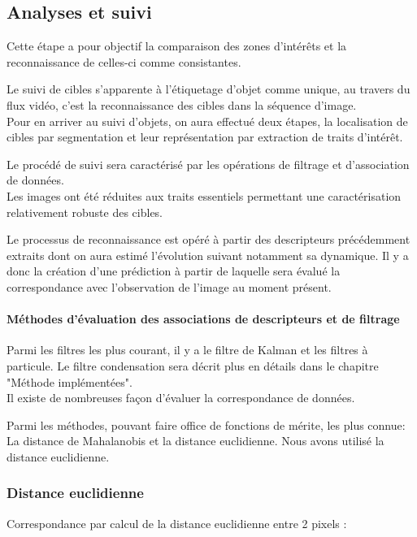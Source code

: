 \documentclass[a4paper,12pt]{report}
\begin{document}
\subsection{Analyses et suivi}
Cette étape a pour objectif la comparaison des zones d'intérêts et la reconnaissance de celles-ci comme consistantes.

Le suivi de cibles s'apparente à l'étiquetage d'objet comme unique, au travers du flux vidéo, c'est la reconnaissance des cibles dans la séquence d'image. \\

Pour en arriver au suivi d'objets, on aura effectué deux étapes, la localisation de cibles par segmentation et leur représentation par extraction de traits d'intérêt.

Le procédé de suivi sera caractérisé par les opérations de filtrage et d'association de données.  \\

Les images ont été réduites aux traits essentiels permettant une caractérisation relativement robuste des cibles. 

Le processus de reconnaissance est opéré à partir des descripteurs précédemment extraits dont on aura estimé l'évolution suivant notamment sa dynamique. Il y a donc la création d'une prédiction à partir de laquelle sera évalué la correspondance avec l'observation de l'image au moment présent. 

\paragraph{Méthodes d'évaluation des associations de descripteurs et de filtrage}
Parmi les filtres les plus courant, il y a le filtre de Kalman et les filtres à particule.
Le filtre condensation sera décrit plus en détails dans le chapitre "Méthode implémentées". \\  

Il existe de nombreuses façon d'évaluer la correspondance de données. 

Parmi les méthodes, pouvant faire office de fonctions de mérite, les plus connue: 
La distance de Mahalanobis et la distance euclidienne. Nous avons utilisé la distance euclidienne.

\subsubsection{Distance euclidienne}
Correspondance par calcul de la distance euclidienne entre 2 pixels :
\end{document}
